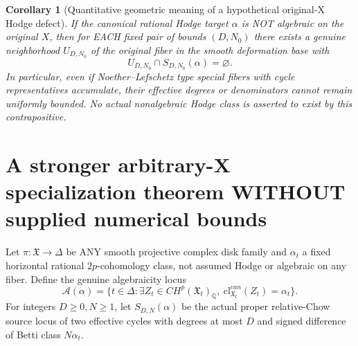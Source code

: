 \documentclass[11pt]{article}
\newcommand{\Q}{\mathbb Q}
\newcommand{\cl}{\mathrm{cl}}
\newtheorem{corollary}[theorem]{Corollary}
\begin{document}
\begin{corollary}[Quantitative geometric meaning of a hypothetical original-X Hodge defect]
If the
canonical rational
Hodge target
\(\alpha\)
is NOT algebraic
on the original
\(X\), then
for EACH
fixed pair
of bounds
\((D,N_0)\)
there exists
a genuine
neighborhood
\(U_{D,N_0}\)
of the
original fiber
in the
smooth deformation
base with
\[
 \boxed{
 U_{D,N_0}\cap
         S_{D,N_0}(\alpha)=\varnothing.}
                                                               \tag{3c}
\]
In particular,
even if
Noether--Lefschetz
type
special fibers
with cycle
representatives
accumulate,
their effective
degrees or
denominators
cannot remain
uniformly
bounded.
No actual
nonalgebraic
Hodge class
is asserted
to exist
by this
contrapositive.
\end{corollary}

\section{A stronger arbitrary-X specialization theorem WITHOUT supplied numerical bounds}
Let \(\pi:\mathfrak X\to\Delta\) be ANY smooth projective
complex disk family and \(\alpha_t\) a fixed horizontal
rational \(2p\)-cohomology class, not assumed Hodge or
algebraic on any fiber. Define the genuine algebraicity locus
\[
 \mathscr A(\alpha)=
 \{t\in\Delta:\exists Z_t\in CH^p(\mathfrak X_t)_\Q,
          \ \cl_{\mathfrak X_t}^{can}(Z_t)=\alpha_t\}.
\]
For integers \(D\ge0,N\ge1\), let
\(S_{D,N}(\alpha)\) be the actual proper relative-Chow
source locus of two effective cycles with degrees at most
\(D\) and signed difference of Betti class \(N\alpha_t\).
\end{document}
